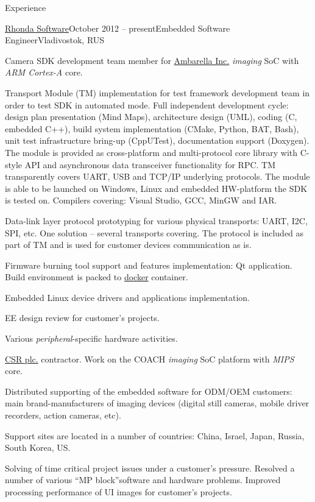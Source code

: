 \documentclass{template}
\begin{document}
\begin{rSection}{Experience}
\begin{rCompany}{\href{http://www.rhondasoftware.com}{Rhonda Software}}{October 2012 -- present}{Embedded Software Engineer}{Vladivostok, RUS}
\item Camera SDK development team member for \href{http://www.ambarella.com}{Ambarella Inc.} \textit{imaging} SoC with \textit{ARM Cortex-A} core.
\item Transport Module (TM) implementation for test framework development team in order to test SDK in automated mode. Full independent development cycle: design plan presentation (Mind Maps), architecture design (UML), coding (C, embedded C++), build system implementation (CMake, Python, BAT, Bash), unit test infrastructure bring-up (CppUTest), documentation support (Doxygen). The module is provided as cross-platform and multi-protocol core library with C-style API and asynchronous data transceiver functionality for RPC. TM transparently covers UART, USB and TCP/IP underlying protocols. The module is able to be launched on Windows, Linux and embedded HW-platform the SDK is tested on. Compilers covering: Visual Studio, GCC, MinGW and IAR.
\item Data-link layer protocol prototyping for various physical transports: UART, I2C, SPI, etc. One solution -- several transports covering. The protocol is included as part of TM and is used for customer devices communication as is.
\item Firmware burning tool support and features implementation: Qt application. Build environment is packed to \href{www.docker.com}{docker} container.
\item Embedded Linux device drivers and applications implementation.
\item EE design review for customer's projects.
\item Various \textit{peripheral}-specific hardware activities. \newline
\item \href{http://www.csr.com}{CSR plc.} contractor. Work on the COACH \textit{imaging} SoC platform with \textit{MIPS} core.
\item Distributed supporting of the embedded software for ODM/OEM customers: main brand-manufacturers of imaging devices (digital still cameras, mobile driver recorders, action cameras, etc).
\item Support sites are located in a number of countries: China, Israel, Japan, Russia, South Korea, US.
\item Solving of time critical project issues under a customer's pressure. Resolved a number of various \textquotedblleft MP block\textquotedblright software and hardware problems. Improved processing performance of UI images for customer's projects.

\end{rCompany}
\end{rSection}
\end{document}
